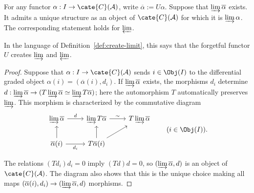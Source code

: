 \begin{lemma}\label{prop:limits-cplx}
	For any functor $\alpha:I\to\cate{C}(\mathcal{A})$, write
	$\overline{\alpha}:=U\alpha$. Suppose that
	$\varinjlim\overline{\alpha}$ exists. It admits a unique structure as an
	object of $\cate{C}(\mathcal{A})$ for which it is $\varinjlim\alpha$.
	The corresponding statement holds for $\varprojlim$.

	In the language of Definition~\ref{def:create-limit}, this says that the
	forgetful functor $U$ creates $\varinjlim$ and $\varprojlim$.
\end{lemma}
\begin{proof}
	Suppose that $\alpha:I\to\cate{C}(\mathcal{A})$ sends
	$i\in\Obj(I)$ to the differential graded object
	$\alpha(i)=(\overline{\alpha}(i),d_i)$. If
	$\varinjlim\overline{\alpha}$ exists, the morphisms $d_i$ determine
	$d:\varinjlim\overline{\alpha}\to
	(T\varinjlim\overline{\alpha}\simeq
	\varinjlim T\overline{\alpha})$; here the automorphism $T$ automatically
	preserves $\varinjlim$. This morphism is characterized by the commutative
	diagram
	\[\begin{tikzcd}
		\varinjlim \overline{\alpha} \arrow[r, "d"] & \varinjlim T\overline{\alpha} \arrow[r, "\sim"] & T\varinjlim \overline{\alpha} \\
		\overline{\alpha}(i) \arrow[u] \arrow[r, "{d_i}"'] & T\overline{\alpha}(i) \arrow[u] \arrow[ru] &
	\end{tikzcd} \qquad (i \in \Obj(I)) . \]

	The relations $(Td_i)d_i=0$ imply $(Td)d=0$, so
	$(\varinjlim\overline{\alpha},d)$ is an object of
	$\cate{C}(\mathcal{A})$. The diagram also shows that this is the unique
	choice making all maps
	$(\overline{\alpha}(i),d_i)\to
	(\varinjlim\overline{\alpha},d)$ morphisms.


\end{proof}
